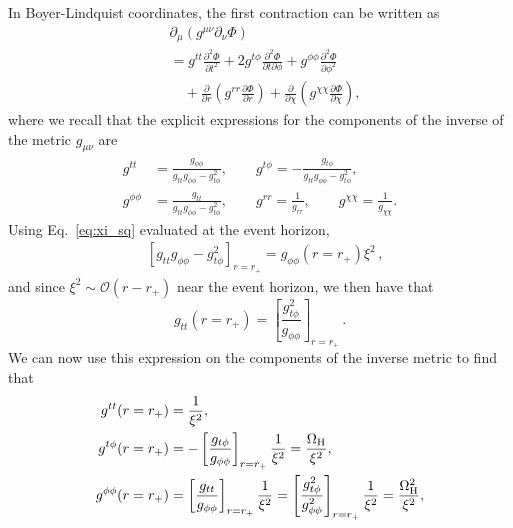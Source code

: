 \documentclass[aps,prx,amsmath,floats,floatfix,twocolumn,
  superscriptaddress,nofootinbib,showpacs]{revtex4-1}
\begin{document}
In Boyer-Lindquist coordinates, the first contraction can be written as 
\begin{equation}
\begin{split}
& \partial_{\mu} \left( g^{\mu \nu}  \partial_{\nu} \Phi \right) \\
& = g^{tt} \frac{\partial^2 \Phi}{\partial t^2} + 2 g^{t\phi} \frac{\partial^2 \Phi}{\partial t \partial \phi}  + g^{\phi \phi} \frac{\partial^2 \Phi}{\partial \phi^2} \\
& \quad + \frac{\partial}{\partial r} \left( g^{rr} \frac{\partial \Phi}{\partial r} \right) + \frac{\partial}{\partial \chi} \left( g^{\chi \chi} \frac{\partial \Phi}{\partial \chi} \right), 
\end{split}
\end{equation}
where we recall that the explicit expressions for the components of the inverse of the metric $g_{\mu \nu} $ are
\begin{align}
g^{tt} & = \frac{g_{\phi \phi}}{g_{tt} g_{\phi \phi} - g_{t \phi}^2}, \qquad
g^{t\phi}  = - \frac{g_{t \phi}}{g_{tt} g_{\phi \phi} - g_{t \phi}^2}, \\
g^{\phi \phi} & = \frac{g_{tt}}{g_{tt} g_{\phi \phi} - g_{t \phi}^2}, \qquad
g^{rr}  = \frac{1}{g_{rr}}, \qquad
g^{\chi \chi}  = \frac{1}{g_{\chi \chi}}. 
\end{align}
Using Eq.~\eqref{eq:xi_sq} evaluated at the event horizon, 
\begin{equation}
\begin{split}
& \left[ g_{tt} g_{\phi \phi} - g_{t \phi}^2 \right]_{r=r_+} = g_{\phi \phi}(r=r_+) \xi^2\,,
\end{split}
\end{equation}
and since $\xi^2 \sim \mathcal{O}(r-r_+)$ near the event horizon, we then have that
\begin{equation}
g_{tt}(r=r_+) = \left[ \frac{g_{t \phi}^2}{g_{\phi \phi}}\right]_{r=r_+}\,. 
\end{equation}
We can now use this expression on the components of the inverse metric to find that  
\begin{equation}
\begin{split}
g^{tt}(r=r_+) & = \frac{1}{\xi^2}, \\
g^{t\phi}(r=r_+) & = - \left[\frac{g_{t \phi}}{g_{\phi \phi}}\right]_{r=r_+} \frac{1}{\xi^2} = \frac{\Omega_{\rm H}}{\xi^2}, \\
g^{\phi \phi}(r=r_+) & = \left[\frac{g_{t t}}{g_{\phi \phi}}\right]_{r=r_+} \frac{1}{\xi^2} = \left[ \frac{g_{t \phi}^2}{g_{\phi \phi}^2}\right]_{r=r_+} \frac{1}{\xi^2} =  \frac{\Omega_{\rm H}^2}{\xi^2},  
\end{split}
\end{equation}
\end{document}
